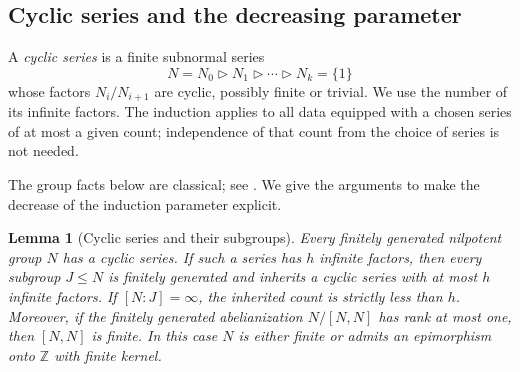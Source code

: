 \documentclass[11pt]{article}
\newtheorem{lemma}[theorem]{Lemma}
\theoremstyle{definition}
\begin{document}
\subsection{Cyclic series and the decreasing parameter}

A \emph{cyclic series} is a finite subnormal series
\[
 N=N_0\triangleright N_1\triangleright\cdots\triangleright N_k=\{1\}
\]
whose factors $N_i/N_{i+1}$ are cyclic, possibly finite or trivial.
We use the number of its infinite factors. The induction applies to
all data equipped with a chosen series of at most a given count;
independence of that count from the choice of series is not needed.

The group facts below are classical; see
\cite[Theorems~5.2.5 and~5.2.18]{Robinson1996}.
We give the arguments to make the decrease of the induction parameter
explicit.

\begin{lemma}[Cyclic series and their subgroups]
\label{lem:rank}
Every finitely generated nilpotent group $N$ has a cyclic series.
If such a series has $h$ infinite factors, then every subgroup $J\le N$
is finitely generated and inherits a cyclic series with at most $h$
infinite factors. If $[N:J]=\infty$, the inherited count is strictly
less than $h$.
Moreover, if the finitely generated abelianization $N/[N,N]$ has rank
at most one, then $[N,N]$ is finite. In this case $N$ is either finite
or admits an epimorphism onto $\mathbb Z$ with finite kernel.
\end{lemma}
\end{document}
